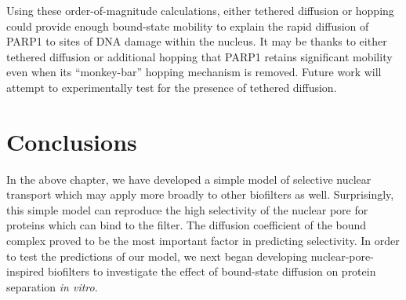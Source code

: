 
Using these order-of-magnitude calculations, either tethered diffusion or hopping could provide enough bound-state mobility to explain the rapid diffusion of PARP1 to sites of DNA damage within the nucleus.  It may be thanks to either tethered diffusion or additional hopping that PARP1 retains significant mobility even when its ``monkey-bar'' hopping mechanism is removed.  Future work will attempt to experimentally test for the presence of tethered diffusion.

\section{Conclusions}

In the above chapter, we have developed a simple model of selective nuclear transport which may apply more broadly to other biofilters as well.  Surprisingly, this simple model can reproduce the high selectivity of the nuclear pore for proteins which can bind to the filter.  The diffusion coefficient of the bound complex proved to be the most important factor in predicting selectivity.  In order to test the predictions of our model, we next began developing nuclear-pore-inspired biofilters to investigate the effect of bound-state diffusion on protein separation \textit{in vitro}.
